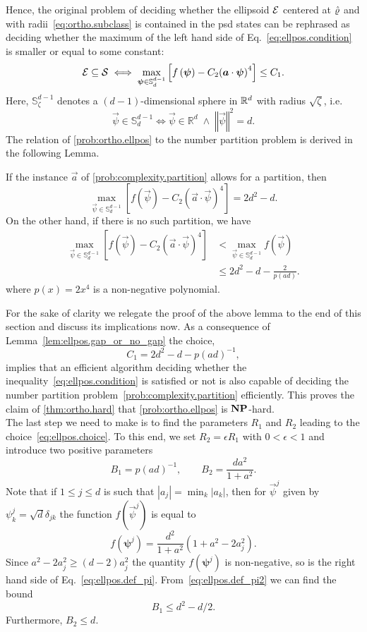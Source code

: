 Hence, the original problem of deciding whether the ellipsoid $\mathcal{E}$ centered at $\hat{\varrho}$ and with radii~\eqref{eq:ortho.subclass} is contained in the psd states can be rephrased as deciding whether the maximum of the left hand side of Eq.~\eqref{eq:ellpos.condition} is smaller or equal to some constant:
\[
  \mathcal{E}\subseteq\mathcal{S}
  \iff
  \max_{{\boldsymbol{\psi}}\in\mathbb{S}^{d-1}_{d}}\left[f\left({\boldsymbol{\psi}}\right)-C_{2}{\left({\boldsymbol{a}} \cdot {\boldsymbol{\psi}}\right)}^{4}\right]\leq C_{1}.
  \label{eq:ellpos.max_condition}
\]
Here, $\mathbb{S}^{d-1}_{\zeta}$ denotes a $(d-1)$-dimensional sphere in ${\mathbb{R}}^d$ with radius $\sqrt\zeta$, i.e.
\[
 \vec\psi\in\mathbb{S}^{d-1}_{d} \iff    \vec\psi\in\mathbb{R}^{d}\;\wedge \; \left\Vert \vec\psi\right\Vert^{2}=d.
\]
The relation of \cref{prob:ortho.ellpos} to the number partition problem is derived in the following Lemma.
\begin{lemma}\label{lem:ellpos.gap_or_no_gap}
  If the instance $\vec a$ of \cref{prob:complexity.partition} allows for a partition, then
  \[
    \max_{\vec\psi\in\mathbb{S}^{d-1}_{d}}\left[f\left(\vec\psi\right)-C_{2}{\left( \vec a \cdot \vec\psi\right)}^{4}\right]
    = 2d^{2}-d \label{eq:ellpos.def_pi0}.
  \]
  On the other hand, if there is no such partition, we have
 \begin{align}
    \max_{\vec\psi\in\mathbb{S}^{d-1}_{d}}\left[f\left(\vec\psi\right)-C_{2}{\left( \vec a \cdot \vec\psi\right)}^{4}\right]
    &<   \max_{\vec\psi\in\mathbb{S}^{d-1}_{d}}f\left(\vec\psi\right)\label{eq:ellpos.def_pi}\\
    &\leq 2d^{2}-d - \frac{2}{p(a d)}
    \label{eq:ellpos.def_pi2}.
  \end{align}
  where $p(x)=2 x^4$ is a non-negative polynomial.
\end{lemma}
For the sake of clarity we relegate the proof of the above lemma to the end of this section and discuss its implications now.
As a consequence of Lemma~\ref{lem:ellpos.gap_or_no_gap} the choice,
\[
  C_{1}=2d^{2}-d-p{(a d)}^{-1},
  \label{eq:ellpos.choice}
\]
implies that an efficient algorithm deciding whether the inequality~\eqref{eq:ellpos.condition} is satisfied or not is also capable of deciding the number partition problem~\ref{prob:complexity.partition} efficiently.
This proves the claim of \cref{thm:ortho.hard} that \cref{prob:ortho.ellpos} is $\mathbf{NP}$-hard.\\


The last step we need to make is to find the parameters $R_{1}$ and $R_{2}$ leading to the choice~\eqref{eq:ellpos.choice}.
To this end, we set $R_{2}=\epsilon R_{1}$ with $0<\epsilon<1$ and introduce two positive parameters
\[
  B_{1}=p{(a d)}^{-1},\qquad B_{2}=\frac{d a^2}{1+a^2}.
\]
Note that if $1\leq j\leq d$ is such that $|a_j|=\min_k |a_k|$, then for $\vec\psi^j$ given by $\psi^j_k=\sqrt{d} \delta_{jk}$ the function $f(\vec\psi^j)$ is equal to
\[
f\left(\boldsymbol{\psi}^{j}\right)=\frac{d^{2}}{1+a^{2}}\left(1+a^{2}-2a_{j}^{2}\right).
\]
Since $a^2-2a_j^2\geq(d-2)a_j^2$ the quantity $f(\boldsymbol{\psi}^{j})$ is non-negative, so is the right hand side of Eq.~\eqref{eq:ellpos.def_pi}.
From~\eqref{eq:ellpos.def_pi2} we can find the bound
\[
  \label{eq:ellpos.b1_bound}
  B_{1} \le d^{2}-d/2.
\]
Furthermore, $B_{2} \le d$.

